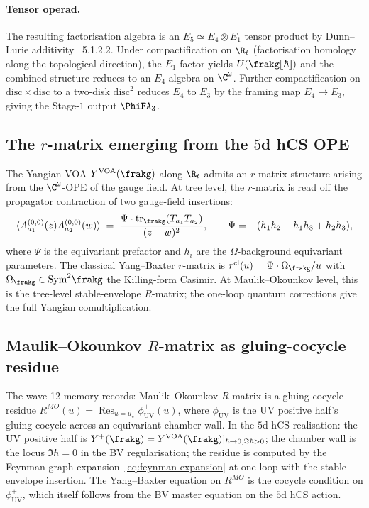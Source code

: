 \paragraph{Tensor operad.}
The resulting factorisation algebra is an $E_5 \simeq E_4\otimes E_1$
tensor product by Dunn--Lurie additivity~\cite{LurieHA} 5.1.2.2. Under
compactification on $\R_t$ (factorisation homology along the
topological direction), the $E_1$-factor yields
$U(\frakg[\![\hbar]\!])$ and the combined structure reduces to an
$E_4$-algebra on $\C^2$. Further compactification on $\mathrm{disc}
\times\mathrm{disc}$ to a two-disk $\mathrm{disc}^2$ reduces $E_4$ to
$E_3$ by the framing map $E_4\to E_3$, giving the Stage-$1$ output
$\PhiFA_3$.

\subsection*{The $r$-matrix emerging from the $5$d hCS OPE}

The Yangian VOA $Y^{\mathrm{VOA}}(\frakg)$ along $\R_t$ admits an
$r$-matrix structure arising from the $\C^2$-OPE of the gauge field.
At tree level, the $r$-matrix is read off the propagator contraction
of two gauge-field insertions:
\begin{equation}
\label{eq:r-matrix-tree}
  \langle A^{(0,0)}_{a_1}(z) A^{(0,0)}_{a_2}(w)\rangle
  \;=\;
  \frac{\Psi \cdot \mathrm{tr}_\frakg(T_{a_1}T_{a_2})}{(z-w)^2},
\qquad
  \Psi = -(h_1 h_2 + h_1 h_3 + h_2 h_3),
\end{equation}
where $\Psi$ is the equivariant prefactor and $h_i$ are the
$\Omega$-background equivariant parameters. The classical Yang--Baxter
$r$-matrix is
$r^{\mathrm{cl}}(u) = \Psi\cdot \Omega_\frakg / u$ with
$\Omega_\frakg \in \mathrm{Sym}^2\frakg$ the Killing-form Casimir.
At Maulik--Okounkov level, this is the tree-level stable-envelope
$R$-matrix; the one-loop quantum corrections give the full Yangian
comultiplication.

\subsection*{Maulik--Okounkov $R$-matrix as gluing-cocycle residue}

The wave-12 memory records: Maulik--Okounkov $R$-matrix is a
gluing-cocycle residue
$R^{MO}(u) = \operatorname{Res}_{u=u_\star}\phi^+_{\mathrm{UV}}(u)$,
where $\phi^+_{\mathrm{UV}}$ is the UV positive half's gluing cocycle
across an equivariant chamber wall. In the $5$d hCS realisation:
the UV positive half is
$Y^+(\frakg) = Y^{\mathrm{VOA}}(\frakg)|_{\hbar \to 0, \Im\hbar > 0}$;
the chamber wall is the locus $\Im\hbar = 0$ in the BV
regularisation; the residue is computed by the Feynman-graph
expansion~\eqref{eq:feynman-expansion} at one-loop with the
stable-envelope insertion. The Yang--Baxter equation on $R^{MO}$ is
the cocycle condition on $\phi^+_{\mathrm{UV}}$, which itself follows
from the BV master equation on the $5$d hCS action.


